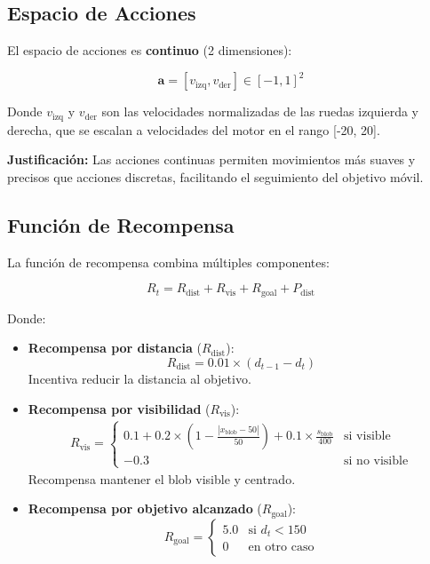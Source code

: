 \documentclass[12pt,a4paper]{article}
\begin{document}
\subsection{Espacio de Acciones}

El espacio de acciones es \textbf{continuo} (2 dimensiones):

\begin{equation}
\mathbf{a} = [v_{\text{izq}}, v_{\text{der}}] \in [-1, 1]^2
\end{equation}

Donde $v_{\text{izq}}$ y $v_{\text{der}}$ son las velocidades normalizadas de las ruedas izquierda y derecha, que se escalan a velocidades del motor en el rango [-20, 20].

\textbf{Justificación:} Las acciones continuas permiten movimientos más suaves y precisos que acciones discretas, facilitando el seguimiento del objetivo móvil.

\subsection{Función de Recompensa}

La función de recompensa combina múltiples componentes:

\begin{equation}
R_t = R_{\text{dist}} + R_{\text{vis}} + R_{\text{goal}} + P_{\text{dist}}
\end{equation}

Donde:

\begin{itemize}
    \item \textbf{Recompensa por distancia} ($R_{\text{dist}}$):
    \begin{equation}
    R_{\text{dist}} = 0.01 \times (d_{t-1} - d_t)
    \end{equation}
    Incentiva reducir la distancia al objetivo.
    
    \item \textbf{Recompensa por visibilidad} ($R_{\text{vis}}$):
    \begin{align}
    R_{\text{vis}} = \begin{cases}
    0.1 + 0.2 \times (1 - \frac{|x_{\text{blob}} - 50|}{50}) + 0.1 \times \frac{s_{\text{blob}}}{400} & \text{si visible} \\
    -0.3 & \text{si no visible}
    \end{cases}
    \end{align}
    Recompensa mantener el blob visible y centrado.
    
    \item \textbf{Recompensa por objetivo alcanzado} ($R_{\text{goal}}$):
    \begin{equation}
    R_{\text{goal}} = \begin{cases}
    5.0 & \text{si } d_t < 150 \\
    0 & \text{en otro caso}
    \end{cases}
    \end{equation}
\end{itemize}
\end{document}
